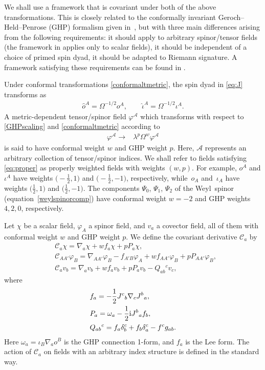 \documentclass[pdftex]{sigma}
\numberwithin{equation}{section}
\begin{document}
We shall use a framework that is covariant under both of the above transformations. This is closely related to the conformally invariant Geroch--Held--Penrose (GHP) formalism given in~\mbox{\cite[Section 5.6]{PR:I}}, but with three main differences arising from the following requirements: it should apply to arbitrary spinor/tensor fields (the framework in \cite[Section 5.6]{PR:I} applies only to scalar fields), it should be independent of a choice of primed spin dyad, it should be adapted to Riemann signature. A framework satisfying these requirements can be found in \cite{araneda2021conformal}.

Under conformal transformations \eqref{conformaltmetric}, the spin dyad in \eqref{eq:J} transforms as
\begin{align}\label{conformaloiota}
\hat{o}^{A}=\Omega^{-1/2}o^{A}, \qquad \hat\iota^A=\Omega^{-1/2}\iota^A.
\end{align}
A metric-dependent tensor/spinor field $\varphi^{\mathcal{A}}$ which transforms with respect to \eqref{GHPscaling} and \eqref{conformaltmetric} according to
\begin{align} \label{eq:proper}
\varphi^{\mathcal{A}} \to{}& \lambda^p \Omega^w \varphi^{\mathcal{A}}
\end{align}
is said to have conformal weight $w$ and GHP weight $p$. Here, $\mathcal{A}$ represents an arbitrary collection of tensor/spinor indices. We shall refer to fields satisfying \eqref{eq:proper} as properly weighted fields with weights $(w,p)$.
For example, $o^{A}$ and $\iota^{A}$ have weights $\bigl(-\frac{1}{2},1\bigr)$ and $\bigl(-\frac{1}{2},-1\bigr)$, respectively, while~$o_{A}$ and~$\iota_{A}$ have weights $\bigl(\frac{1}{2},1\bigr)$ and $\bigl(\frac{1}{2},-1\bigr)$. The components $\Psi_0$, $\Psi_1$, $\Psi_2$ of the Weyl~spinor (equation~\eqref{weylspinorcomp}) have conformal weight $w=-2$ and GHP weights $4, 2, 0$, respectively.

Let $\chi$ be a scalar field, $\varphi_{A}$ a spinor field, and $v_{a}$ a covector field, all of them with conformal weight $w$ and GHP weight $p$.
We define the covariant derivative $\mathcal{C}_{a}$ by
\begin{align*} %
&\mathcal{C}_{a}\chi= \nabla_{a}\chi + wf_{a}\chi + p P_{a}\chi, \\
&\mathcal{C}_{AA'}\varphi_{B}= \nabla_{AA'}\varphi_{B} - f_{A'B}\varphi_{A} + wf_{AA'}\varphi_{B} + p P_{AA'}\varphi_{B}, \\
&\mathcal{C}_{a}v_b= \nabla_{a}v_{b} + wf_{a}v_{b} + p P_{a}v_{b} - Q_{ab}{}^{c}v_{c},
\end{align*}
where
\begin{align}
&f_{a} = -\frac{1}{2}J^{c}{}_{b}\nabla_{c}J^{b}{}_{a}, \label{LeeForm} \\
&P_{a} = \omega_{a} -\frac{1}{2} {\rm i} J^{b}{}_{a}f_{b}, \label{1formP} \\
&Q_{ab}{}^{c} = f_{a}\delta^{c}_{b} + f_{b}\delta^{c}_{a} - f^{c}g_{ab}. \nonumber
\end{align}
Here $\omega_{a}=\iota_{B}\nabla_{a}o^{B}$ is the GHP connection 1-form, and $f_{a}$ is the Lee form.
The action of $\mathcal{C}_{a}$ on fields with an arbitrary index structure is defined in the standard way.
\end{document}
